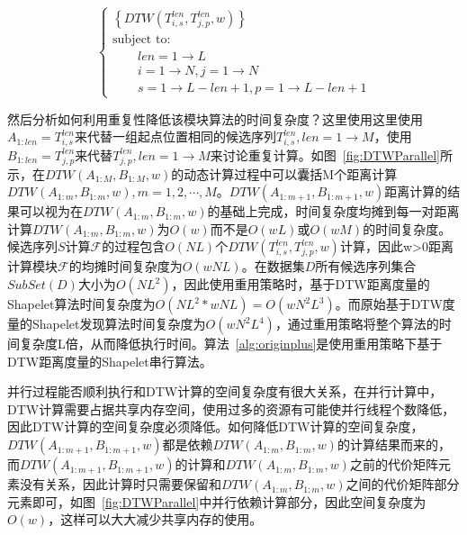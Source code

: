 \begin{equation}\label{equ:chap04:BasicOp}
\left\{\begin{array}{l}
\left\lbrace DTW(T_{i,s}^{len},T_{j,p}^{len},w) \right\rbrace \\[0.1cm]
\mbox{subject to:}\\[0.1cm]
\qquad len = 1 \to L \\[0.1cm]
\qquad i=1\to N,j=1\to N\\[0.1cm]
\qquad s=1\to L-len+1,p=1\to L-len+1 
\end{array}\right.
\end{equation}

然后分析如何利用重复性降低该模块算法的时间复杂度？这里使用这里使用$A_{1:len}=T_{i,s}^{len}$来代替一组起点位置相同的候选序列$T_{i,s}^{len},len=1\to M$，使用$B_{1:len}=T_{j,p}^{len}$来代替$T_{j,p}^{len},len=1\to M$来讨论重复计算。如图~\ref{fig:DTWParallel}所示，在$DTW(A_{1:M},B_{1:M},w)$的动态计算过程中可以囊括M个距离计算$DTW(A_{1:m},B_{1:m},w),m=1,2,\cdots,M$。$DTW(A_{1:m+1},B_{1:m+1},w)$距离计算的结果可以视为在$DTW(A_{1:m},B_{1:m},w)$的基础上完成，时间复杂度均摊到每一对距离计算$DTW(A_{1:m},B_{1:m},w)$为$O(w)$而不是$O(wL)$或$O(wM)$的时间复杂度。候选序列$S$计算$\mathcal{F}$的过程包含$O(NL)$个$DTW(T_{i,s}^{len},T_{j,p}^{len},w)$计算，因此w>0距离计算模块$\mathcal{F}$的均摊时间复杂度为$O(wNL)$。在数据集$D$所有候选序列集合$SubSet(D)$大小为$O(NL^2)$，因此使用重用策略时，基于DTW距离度量的Shapelet算法时间复杂度为$O(NL^2*wNL)=O(wN^2L^3)$。而原始基于DTW度量的Shapelet发现算法时间复杂度为$O(wN^2L^4)$，通过重用策略将整个算法的时间复杂度L倍，从而降低执行时间。算法~\ref{alg:originplus}是使用重用策略下基于DTW距离度量的Shapelet串行算法。

并行过程能否顺利执行和DTW计算的空间复杂度有很大关系，在并行计算中，DTW计算需要占据共享内存空间，使用过多的资源有可能使并行线程个数降低，因此DTW计算的空间复杂度必须降低。如何降低DTW计算的空间复杂度，$DTW(A_{1:m+1},B_{1:m+1},w)$都是依赖$DTW(A_{1:m},B_{1:m},w)$的计算结果而来的，而$DTW(A_{1:m+1},B_{1:m+1},w)$的计算和$DTW(A_{1:m},B_{1:m},w)$之前的代价矩阵元素没有关系，因此计算时只需要保留和$DTW(A_{1:m},B_{1:m},w)$之间的代价矩阵部分元素即可，如图~\ref{fig:DTWParallel}中并行依赖计算部分，因此空间复杂度为$O(w)$，这样可以大大减少共享内存的使用。

